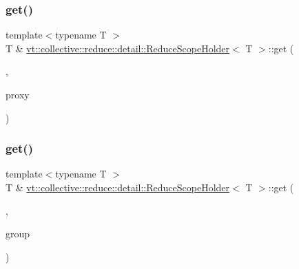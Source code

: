 \subsubsection{\texorpdfstring{get()}{get()}\hspace{0.1cm}{\footnotesize\ttfamily [3/6]}}
{\footnotesize\ttfamily template$<$typename T $>$ \\
T \& \hyperlink{structvt_1_1collective_1_1reduce_1_1detail_1_1_reduce_scope_holder}{vt\+::collective\+::reduce\+::detail\+::\+Reduce\+Scope\+Holder}$<$ T $>$\+::get (\begin{DoxyParamCaption}\item[{\hyperlink{structvt_1_1collective_1_1reduce_1_1detail_1_1_reduce_scope_holder_1_1_vrt_proxy_tag}{Vrt\+Proxy\+Tag}}]{,  }\item[{\hyperlink{namespacevt_a1b417dd5d684f045bb58a0ede70045ac}{Virtual\+Proxy\+Type}}]{proxy }\end{DoxyParamCaption})}

\mbox{\label{structvt_1_1collective_1_1reduce_1_1detail_1_1_reduce_scope_holder_a666bfa6fa622e3954d6f1a267de48c2e}} 
\subsubsection{\texorpdfstring{get()}{get()}\hspace{0.1cm}{\footnotesize\ttfamily [4/6]}}
{\footnotesize\ttfamily template$<$typename T $>$ \\
T \& \hyperlink{structvt_1_1collective_1_1reduce_1_1detail_1_1_reduce_scope_holder}{vt\+::collective\+::reduce\+::detail\+::\+Reduce\+Scope\+Holder}$<$ T $>$\+::get (\begin{DoxyParamCaption}\item[{\hyperlink{structvt_1_1collective_1_1reduce_1_1detail_1_1_reduce_scope_holder_1_1_group_tag}{Group\+Tag}}]{,  }\item[{\hyperlink{namespacevt_a27b5e4411c9b6140c49100e050e2f743}{Group\+Type}}]{group }\end{DoxyParamCaption})}

\mbox{\label{structvt_1_1collective_1_1reduce_1_1detail_1_1_reduce_scope_holder_af25ba6525fc0742740c635d9eaa540de}} 
